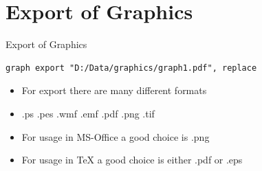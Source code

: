 \section{Export of Graphics}
\begin{frame}[fragile]{Export of Graphics} 
\begin{lstlisting}
graph export "D:/Data/graphics/graph1.pdf", replace
\end{lstlisting}
\begin{itemize}
\item For export there are many different formats
\item .ps .pes .wmf .emf .pdf .png .tif
\item For usage in MS-Office a good choice is .png
\item For usage in TeX a good choice is either .pdf or .eps
\end{itemize}
\end{frame}